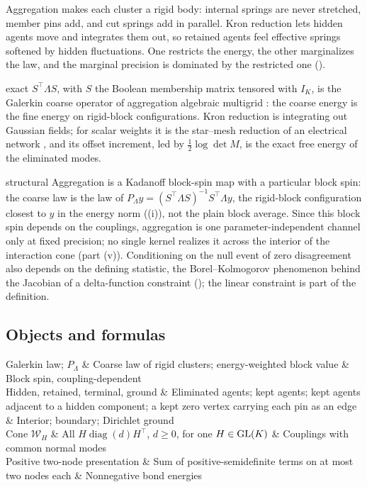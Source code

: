 Aggregation makes each cluster a rigid body: internal springs are never stretched, member pins add, and cut
springs add in parallel. Kron reduction lets hidden agents move and integrates them out, so retained agents feel
effective springs softened by hidden fluctuations. One restricts the energy, the other marginalizes the law, and
the marginal precision is dominated by the restricted one ().

\begin{analogy}{exact}
\(S^\top\Lambda S\), with \(S\) the Boolean membership matrix tensored with \(I_K\), is the Galerkin coarse operator of
aggregation algebraic multigrid \citep{Notay2010Aggregation,LivneBrandt2012LAMG}: the coarse energy is the fine
energy on rigid-block configurations. Kron reduction is integrating out Gaussian fields; for scalar weights it is
the star--mesh reduction of an electrical network \citep[Lemma~II.1]{DorflerBullo2013Kron}, and its offset
increment, led by \(\tfrac12\log\det M\), is the exact free energy of the eliminated modes.
\end{analogy}

\begin{analogy}{structural}
Aggregation is a Kadanoff block-spin map with a particular block spin: the coarse law is the law of
\(P_\Lambda y=(S^\top\Lambda S)^{-1}S^\top\Lambda y\), the rigid-block configuration closest to \(y\) in the energy norm
((i)), not the plain block average. Since this block spin depends on the
couplings, aggregation is one parameter-independent channel only at fixed precision; no single kernel realizes
it across the interior of the interaction cone (part (v)). Conditioning on the null event of zero disagreement
also depends on the defining statistic, the Borel--Kolmogorov phenomenon behind the Jacobian of a delta-function
constraint (); the linear constraint is part of the definition.
\end{analogy}

\subsection{Objects and formulas}

\begin{decoder}
Galerkin law; \(P_\Lambda\) & Coarse law of rigid clusters; energy-weighted block value & Block spin, coupling-dependent\\
Hidden, retained, terminal, ground & Eliminated agents; kept agents; kept agents adjacent to a hidden component; a kept zero vertex carrying each pin as an edge & Interior; boundary; Dirichlet ground\\
Cone \(\mathcal W_H\) & All \(H\operatorname{diag}(d)H^\top\), \(d\geq0\), for one \(H\in\mathrm{GL}(K)\) & Couplings with common normal modes\\
Positive two-node presentation & Sum of positive-semidefinite terms on at most two nodes each & Nonnegative bond energies\\
\end{decoder}

